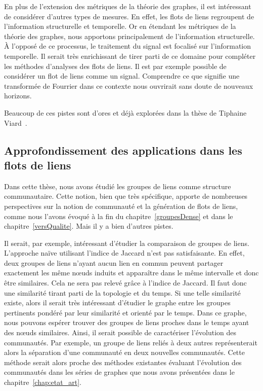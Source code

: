 En plus de l'extension des métriques de la théorie des graphes, il est intéressant de considérer d'autres types de mesures.
En effet, les flots de liens regroupent de l'information structurelle et temporelle.
Or en étendant les métriques de la théorie des graphes, nous apportons principalement de l'information structurelle.
\`A l'opposé de ce processus, le traitement du signal est focalisé sur l'information temporelle.
Il serait très enrichissant de tirer parti de ce domaine pour compléter les méthodes d'analyses des flots de liens.
Il est par exemple possible de considérer un flot de liens comme un signal.
Comprendre ce que signifie une transformée de Fourrier dans ce contexte nous ouvrirait sans doute de nouveaux horizons.

Beaucoup de ces pistes sont d'ores et déjà explorées dans la thèse de Tiphaine Viard~\cite{viard2016flots}.

\subsection{Approfondissement des applications dans les flots de liens}
Dans cette thèse, nous avons étudié les groupes de liens comme structure communautaire.
Cette notion, bien que très spécifique, apporte de nombreuses perspectives sur la notion de communauté et la génération de flots de liens, comme nous l'avons évoqué à la fin du chapitre~\ref{groupesDense} et dans le chapitre~\ref{versQualite}.
Mais il y a bien d'autres pistes.

Il serait, par exemple, intéressant d'étudier la comparaison de groupes de liens.
L'approche naïve utilisant l'indice de Jaccard n'est pas satisfaisante.
En effet, deux groupes de liens n'ayant aucun lien en commun peuvent partager exactement les même n\oe{}uds induits et apparaître dans le même intervalle et donc être similaires.
Cela ne sera pas relevé grâce à l'indice de Jaccard.
Il faut donc une similarité tirant parti de la topologie et du temps.
Si une telle similarité existe, alors il serait très intéressant d'étudier le graphe entre les groupes pertinents pondéré par leur similarité et orienté par le temps.
Dans ce graphe, nous pouvons espérer trouver des groupes de liens proches dans le temps ayant des n\oe{}uds similaires.
Ainsi, il serait possible de caractériser l'évolution des communautés.
Par exemple, un groupe de liens reliés à deux autres représenterait alors la séparation d'une communauté en deux nouvelles communautés.
Cette méthode serait alors proche des méthodes existantes évaluant l'évolution des communautés dans les séries de graphes que nous avons présentées dans le chapitre~\ref{chap:etat_art}.


